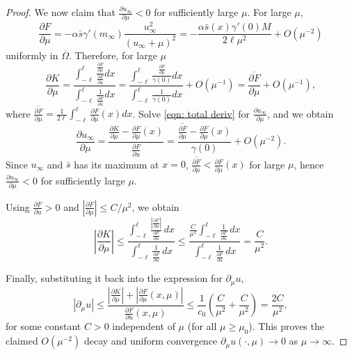 \documentclass[10pt,a4paper]{amsart}
\begin{document}
\begin{proof}
We now claim that $\frac{\partial u_\infty}{\partial \mu}<0$ for sufficiently large $\mu$. For large $\mu$, 
\[\frac{\partial F}{\partial \mu}  = -\alpha\bar s\gamma'(m_\infty) \frac{u_\infty^2}{(u_\infty+\mu)^2}=-\frac{\alpha\bar s(x)\gamma'(0)M}{2\ell\mu^2}+O(\mu^{-2})\] uniformly in $\overline{\Omega}$. Therefore, for large $\mu$
\[\frac{\partial K}{\partial \mu}  = \frac{\displaystyle\int_{-\ell}^{\ell}\frac{\frac{\partial F}{\partial \mu} }{\frac{\partial F}{\partial u} }dx}{\displaystyle\int_{-\ell}^{\ell}\frac{1}{\frac{\partial F}{\partial u} }dx}=\frac{\displaystyle\int_{-\ell}^{\ell}\frac{\frac{\partial F}{\partial \mu} }{\gamma(0)}dx}{\displaystyle\int_{-\ell}^{\ell}\frac{1}{\gamma(0)}dx} +O(\mu^{-1})= \overline{\frac{\partial F}{\partial \mu} } + O(\mu^{-1}),\] where $\overline{\frac{\partial F}{\partial \mu} } = \frac{1}{2\ell}\int_{-\ell}^\ell \frac{\partial F}{\partial \mu} (x)dx$. Solve \eqref{eqn: total deriv} for $\frac{\partial u_\infty}{\partial \mu}$, and we obtain
\[\frac{\partial u_\infty}{\partial \mu} = \frac{\frac{\partial K}{\partial \mu}  - \frac{\partial F}{\partial \mu} (x)}{\frac{\partial F}{\partial u} } = \frac{\overline{\frac{\partial F}{\partial \mu} }-\frac{\partial F}{\partial \mu} (x)}{\gamma(0)}+O(\mu^{-2}).  \]
Since $u_\infty$ and $\bar s$ has its maximum at $x=0$, $\overline{\frac{\partial F}{\partial \mu} }<\frac{\partial F}{\partial \mu} (x)$ for large $\mu$, hence $\frac{\partial u_\infty}{\partial \mu}<0$ for sufficiently large $\mu$. 

Using $\frac{\partial F}{\partial u} >0$ and $|\frac{\partial F}{\partial \mu} |\le C/\mu^2$, we obtain
\[
|\frac{\partial K}{\partial \mu} |
\le
\frac{\displaystyle\int_{-\ell}^{\ell} \frac{|\frac{\partial F}{\partial \mu} |}{\frac{\partial F}{\partial u} }\,dx}
{\displaystyle\int_{-\ell}^{\ell} \frac{1}{\frac{\partial F}{\partial u} }\,dx}
\le
\frac{\displaystyle\frac{C}{\mu^2}\int_{-\ell}^{\ell} \frac{1}{\frac{\partial F}{\partial u} }\,dx}
{\displaystyle\int_{-\ell}^{\ell} \frac{1}{\frac{\partial F}{\partial u} }\,dx}
= \frac{C}{\mu^2}.
\]

Finally, substituting it back into the expression for $\partial_\mu u$,
\[
|\partial_\mu u|
\le
\frac{|\frac{\partial K}{\partial \mu} | + |\frac{\partial F}{\partial \mu} (x,\mu)|}{\frac{\partial F}{\partial u} (x,\mu)}
\le
\frac{1}{c_0}\left(\frac{C}{\mu^2} + \frac{C}{\mu^2}\right)
= \frac{2C}{\mu^2},
\]
for some constant $C>0$ independent of $\mu$ (for all $\mu\ge \mu_0$). This proves the claimed $O(\mu^{-2})$ decay and uniform convergence $\partial_\mu u(\cdot,\mu)\to 0$ as $\mu\to\infty$.


\end{proof}
\end{document}
